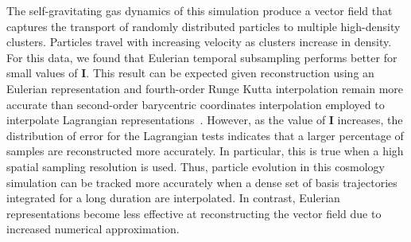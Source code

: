 The self-gravitating gas dynamics of this simulation produce a vector field that captures the transport of randomly distributed particles to multiple high-density clusters.
%
Particles travel with increasing velocity as clusters increase in density.
%
For this data, we found that Eulerian temporal subsampling performs better for small values of \textbf{I}.
%
This result can be expected given reconstruction using an Eulerian representation and fourth-order Runge Kutta interpolation remain more accurate than second-order barycentric coordinates interpolation employed to interpolate Lagrangian representations~\cite{bujack2015lagrangian}\cite{hummel2016error}.
%
%
However, as the value of \textbf{I} increases, the distribution of error for the Lagrangian tests indicates that a larger percentage of samples are reconstructed more accurately.
%
In particular, this is true when a high spatial sampling resolution is used.
%
Thus, particle evolution in this cosmology simulation can be tracked more accurately when a dense set of basis trajectories integrated for a long duration are interpolated.
%
%
%
In contrast, Eulerian representations become less effective at reconstructing the vector field due to increased numerical approximation.
%
%
%

